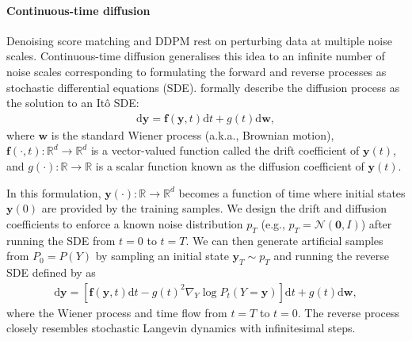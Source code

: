 \paragraph{Continuous-time diffusion}
Denoising score matching and DDPM rest on perturbing data at multiple noise scales. Continuous-time diffusion generalises this idea to an infinite number of noise scales corresponding to formulating the forward and reverse processes as stochastic differential equations (SDE). \citet{song2020score} formally describe the diffusion process as the solution to an It{\^o} SDE:
\begin{align}
  \text{d}\bm{y} = \bm{f}(\bm{y}, t) \text{d}t + g(t) \text{d}\bm{w}, \label{eq:continuous_diffusion}
\end{align}
where $\bm{w}$ is the standard Wiener process (a.k.a., Brownian motion), $\bm{f}(\cdot, t): \mathbb{R}^d \rightarrow \mathbb{R}^d$ is a vector-valued function called the drift coefficient of $\bm{y}(t)$, and $g(\cdot): \mathbb{R} \rightarrow \mathbb{R}$ is a scalar function known as
the diffusion coefficient of $\bm{y}(t)$.

In this formulation, $\bm{y}(\cdot): \mathbb{R} \rightarrow \mathbb{R}^d$ becomes a function of time where initial states $\bm{y}(0)$ are provided by the training samples. We design the drift and diffusion coefficients to enforce a known noise distribution $p_T$ (e.g., $p_T = \mathcal{N}(\bm 0, I)$) after running the SDE from $t=0$ to $t=T$. We can then generate artificial samples from $P_0 = P(Y)$ by sampling an initial state $\bm{y}_T \sim p_T$ and running the reverse SDE defined by \citet{anderson1982reverse} as
\begin{align}
  \text{d}\bm{y} = \left[ \bm{f}(\bm{y}, t) \text{d}t - g(t)^2 \nabla_Y \log P_t(Y=\bm{y}) \right] \text{d}t + g(t) \text{d}\bm{w},\label{eq:continuous_reverse_diffusion}
\end{align}
where the Wiener process and time flow from $t=T$ to $t=0$. The reverse process closely resembles stochastic Langevin dynamics with infinitesimal steps.

